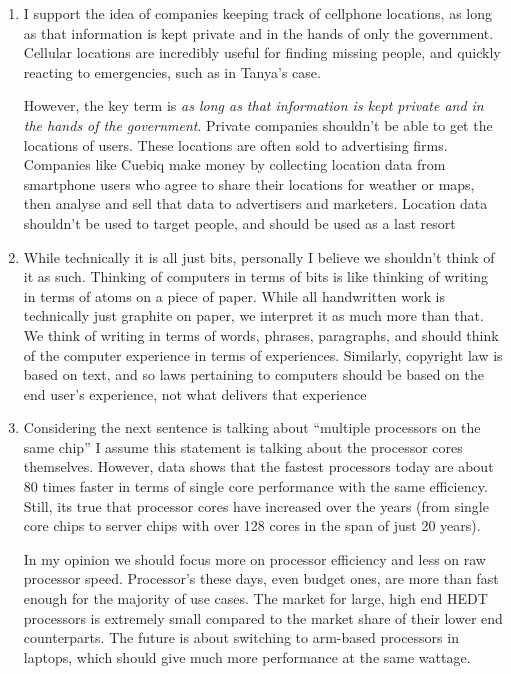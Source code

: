 \documentclass{scrartcl}
\begin{document}
\begin{enumerate}
\item I support the idea of companies keeping track of cellphone locations, as long
as that information is kept private and in the hands of only the government.
Cellular locations are incredibly useful for finding missing people, and
quickly reacting to emergencies, such as in Tanya's case.

However, the key term is \emph{as long as that information is kept private and in
the hands of the government}. Private companies shouldn't be able to get the
locations of users. These locations are often sold to advertising firms.
Companies like Cuebiq make money by collecting location data from smartphone
users who agree to share their locations for weather or maps, then analyse
and sell that data to advertisers and marketers. Location data shouldn't be  used to target people, and should be used as a last resort

\item While technically it is all just bits, personally I believe we shouldn't
think of it as such. Thinking of computers in terms of bits is like thinking
of writing in terms of atoms on a piece of paper. While all handwritten work
is technically just graphite on paper, we interpret it as much more than
that. We think of writing in terms of words, phrases, paragraphs, and should
think of the computer experience in terms of experiences. Similarly,
copyright law is based on text, and so laws pertaining to computers should be
based on the end user's experience, not what delivers that experience

\item Considering the next sentence is talking about ``multiple processors on the
same chip'' I assume this statement is talking about the processor cores
themselves. However, data shows that the fastest processors today are about
80 times faster in terms of single core performance with the same efficiency.
Still, its true that processor cores have increased over the years (from
single core chips to server chips with over 128 cores in the span of just 20
years).

In my opinion we should focus more on processor efficiency and less on raw
processor speed. Processor's these days, even budget ones, are more than fast
enough for the majority of use cases. The market for large, high end HEDT
processors is extremely small compared to the market share of their lower end
counterparts. The future is about switching to arm-based processors in
laptops, which should give much more performance at the same wattage.


\end{enumerate}
\end{document}
